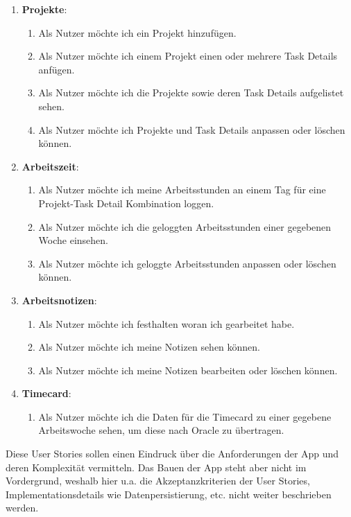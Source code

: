 \documentclass[oneside,bibliography=totocnumbered,BCOR=5mm]{scrbook}
\begin{document}
\begin{enumerate}
  \item \textbf{Projekte}:
    \begin{enumerate}
      \item Als Nutzer möchte ich ein Projekt hinzufügen.
      \item Als Nutzer möchte ich einem Projekt einen oder mehrere Task Details anfügen.
      \item Als Nutzer möchte ich die Projekte sowie deren Task Details aufgelistet sehen.
      \item Als Nutzer möchte ich Projekte und Task Details anpassen oder löschen können.
    \end{enumerate}
  \item \textbf{Arbeitszeit}:
    \begin{enumerate}
      \item Als Nutzer möchte ich meine Arbeitsstunden an einem Tag für eine Projekt-Task Detail Kombination loggen.
      \item Als Nutzer möchte ich die geloggten Arbeitsstunden einer gegebenen Woche einsehen.
      \item Als Nutzer möchte ich geloggte Arbeitsstunden anpassen oder löschen können.
    \end{enumerate}
  \item \textbf{Arbeitsnotizen}:
    \begin{enumerate}
      \item Als Nutzer möchte ich festhalten woran ich gearbeitet habe.
      \item Als Nutzer möchte ich meine Notizen sehen können.
      \item Als Nutzer möchte ich meine Notizen bearbeiten oder löschen können.
    \end{enumerate}
  \item \textbf{Timecard}:
    \begin{enumerate}
      \item Als Nutzer möchte ich die Daten für die Timecard zu einer gegebene Arbeitswoche sehen, um diese nach Oracle zu übertragen.
    \end{enumerate}
\end{enumerate}

Diese User Stories sollen einen Eindruck über die Anforderungen der App
und deren Komplexität vermitteln. Das Bauen der App steht aber nicht im
Vordergrund, weshalb hier u.a. die Akzeptanzkriterien der User Stories,
Implementationsdetails wie Datenpersistierung, etc. nicht weiter beschrieben
werden.
\end{document}
